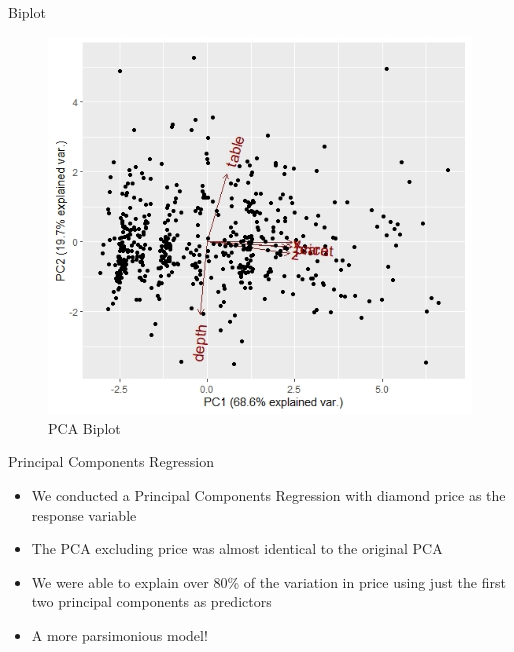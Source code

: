 \documentclass[
  ignorenonframetext,
]{beamer}
\providecommand{\tightlist}{%
  \setlength{\itemsep}{0pt}\setlength{\parskip}{0pt}}
\begin{document}
\begin{frame}{Biplot}
\protect\hypertarget{biplot}{}
\begin{figure}
\centering
\includegraphics[width=\textwidth,height=0.85\textheight]{./Biplot PCA.jpeg}
\caption{PCA Biplot}
\end{figure}
\end{frame}

\begin{frame}{Principal Components Regression}
\protect\hypertarget{principal-components-regression}{}
\begin{itemize}
\tightlist
\item
  We conducted a Principal Components Regression with diamond price as
  the response variable\linebreak
\item
  The PCA excluding price was almost identical to the original
  PCA\linebreak
\item
  We were able to explain over 80\% of the variation in price using just
  the first two principal components as predictors\linebreak 
\item
  A more parsimonious model!\linebreak
\end{itemize}
\end{frame}
\end{document}
